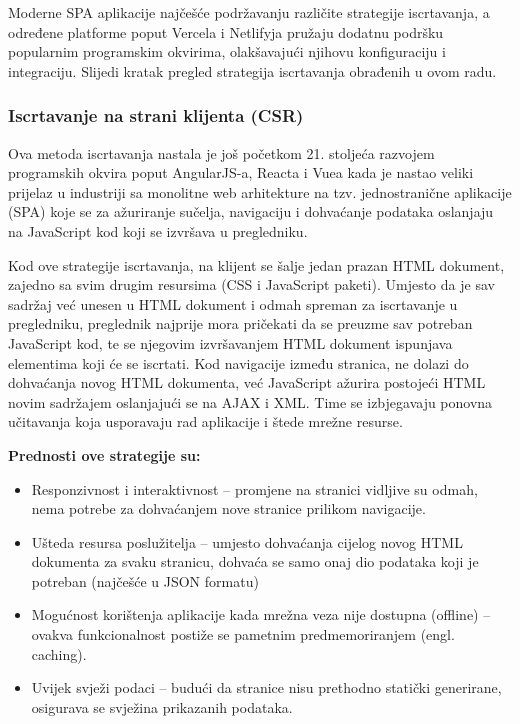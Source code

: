 \bigskip

Moderne SPA aplikacije najčešće  podržavanju različite strategije iscrtavanja, a određene platforme poput Vercela i
Netlifyja pružaju dodatnu podršku popularnim programskim okvirima, olakšavajući njihovu konfiguraciju i integraciju. Slijedi kratak pregled strategija iscrtavanja obrađenih u ovom radu.

\subsubsection{Iscrtavanje na strani klijenta (CSR)}

Ova metoda iscrtavanja nastala je još početkom 21. stoljeća razvojem programskih okvira poput AngularJS-a, Reacta i Vuea kada je nastao veliki prijelaz u industriji sa monolitne web arhitekture na tzv. jednostranične aplikacije (SPA) koje se za ažuriranje sučelja, navigaciju i dohvaćanje podataka oslanjaju na JavaScript kod koji se izvršava u pregledniku.

\bigskip

Kod ove strategije iscrtavanja, na klijent se šalje jedan prazan HTML dokument, zajedno sa svim drugim resursima (CSS i JavaScript paketi). Umjesto da je sav sadržaj već unesen u HTML dokument i odmah spreman za iscrtavanje u pregledniku, preglednik najprije mora pričekati da se preuzme sav potreban JavaScript kod, te se njegovim izvršavanjem HTML dokument ispunjava elementima koji će se iscrtati. Kod navigacije između stranica, ne dolazi do dohvaćanja novog HTML dokumenta, već JavaScript ažurira postojeći HTML novim sadržajem oslanjajući se na AJAX i XML. Time se izbjegavaju ponovna učitavanja koja usporavaju rad aplikacije i štede mrežne resurse. \cite{beran2023usporedba}

\bigskip

\textbf{Prednosti ove strategije su:}

\begin{itemize}
    \item Responzivnost i interaktivnost – promjene na stranici vidljive su odmah, nema potrebe za dohvaćanjem nove stranice prilikom navigacije.
    \item Ušteda resursa poslužitelja – umjesto dohvaćanja cijelog novog HTML dokumenta za svaku stranicu, dohvaća se samo onaj dio podataka koji je potreban (najčešće u JSON formatu)
    \item Mogućnost korištenja aplikacije kada mrežna veza nije dostupna (offline) – ovakva funkcionalnost postiže se pametnim predmemoriranjem (engl. caching).
    \item Uvijek svježi podaci – budući da stranice nisu prethodno statički generirane, osigurava se svježina prikazanih podataka.
\end{itemize}

